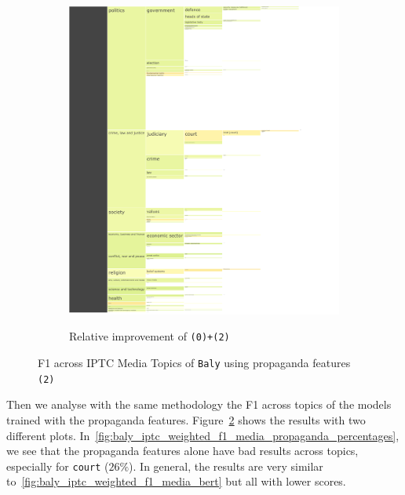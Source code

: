 \begin{figure}[!htbp]
\begin{subfigure}{0.49\textwidth}
    \href{https://martinomensio.github.io/phd-project/figures/baly_iptc_weighted_f1_media_delta.html}{\includegraphics[trim={2.65cm 0cm 0cm 0cm},clip,width=\linewidth]{figures/baly_iptc_weighted_f1_media_delta.pdf}}
    \caption{Relative improvement of \texttt{(0)+(2)}}
    \label{fig:baly_iptc_weighted_f1_media_delta}
\end{subfigure}
\caption{F1 across IPTC Media Topics of \texttt{Baly} using propaganda features \texttt{(2)}}
    \label{fig:baly_iptc_weighted_f1_media_prop}
\end{figure}

Then we analyse with the same methodology the F1 across topics of the models trained with the propaganda features.
Figure~\ref{fig:baly_iptc_weighted_f1_media_prop} shows the results with two different plots. In~\ref{fig:baly_iptc_weighted_f1_media_propaganda_percentages}, we see that the propaganda features alone have bad results across topics, especially for \texttt{court} ($26\%$). In general, the results are very similar to~\ref{fig:baly_iptc_weighted_f1_media_bert} but all with lower scores.

